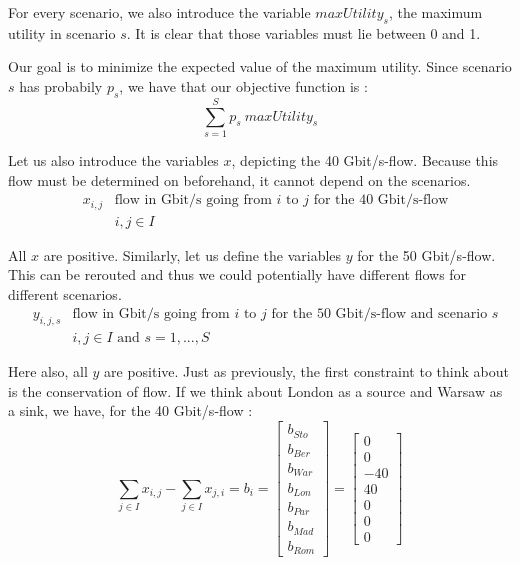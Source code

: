 For every scenario, we also introduce the variable $maxUtility_s$, the maximum utility in scenario $s$. It is clear that those variables must lie between 0 and 1.

Our goal is to minimize the expected value of the maximum utility. Since scenario $s$ has probabily $p_s$, we have that our objective function is :
$$\sum_{s=1}^S p_s\: maxUtility_s$$

Let us also introduce the variables $x$, depicting the 40 Gbit/s-flow. Because this flow must be determined on beforehand, it cannot depend on the scenarios.
\begin{align*}
&x_{i,j} &\text{flow in Gbit/s going from $i$ to $j$ for the 40 Gbit/s-flow}\\
& &i,j \in I
\end{align*}

All $x$ are positive. Similarly, let us define the variables $y$ for the 50 Gbit/s-flow. This can be rerouted and thus we could potentially have different flows for different scenarios.
\begin{align*}
&y_{i,j,s} &\text{flow in Gbit/s going from $i$ to $j$ for the 50 Gbit/s-flow and scenario $s$}\\
& &i,j \in I \text{ and } s=1,...,S
\end{align*}

Here also, all $y$ are positive. Just as previously, the first constraint to think about is the conservation of flow. If we think about London as a source and Warsaw as a sink, we have, for the 40 Gbit/s-flow : 
$$\sum_{j\in I} x_{i,j} - \sum_{j\in I}x_{j,i} = b_i = \begin{bmatrix}
  b_{Sto}\\
  b_{Ber}\\
  b_{War}\\
  b_{Lon}\\
  b_{Par}\\
  b_{Mad}\\
  b_{Rom}
 \end{bmatrix} =
 \begin{bmatrix}
  0\\
  0\\
  -40\\
  40\\
  0\\
  0\\
  0
 \end{bmatrix}$$
 
